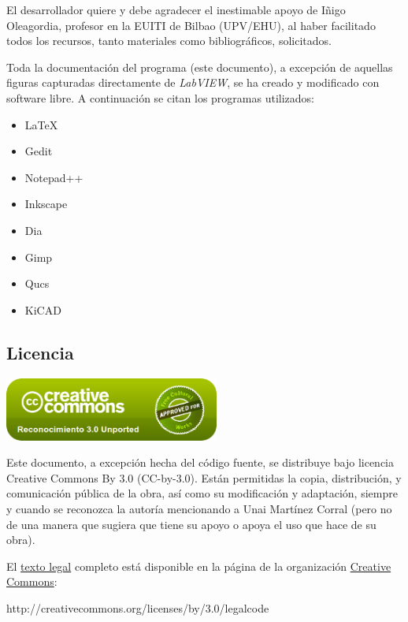 El desarrollador quiere y debe agradecer el inestimable apoyo de Iñigo Oleagordia, profesor en la EUITI de Bilbao (UPV/EHU), al haber facilitado todos los recursos, tanto materiales como bibliográficos, solicitados.

Toda la documentación del programa (este documento), a excepción de aquellas figuras capturadas directamente de \textit{LabVIEW}, se ha creado y modificado con software libre. A continuación se citan los programas utilizados:

\begin{itemize}
  \item{LaTeX}
  \item{Gedit}
  \item{Notepad++}
  \item{Inkscape}
  \item{Dia}
  \item{Gimp}
  \item{Qucs}
  \item{KiCAD}
\end{itemize}
  
\subsection{Licencia}

\begin{center}
 \includegraphics[width=200pt]{./images/ccby.png}
\end{center}

Este documento, a excepción hecha del código fuente, se distribuye bajo licencia Creative Commons By 3.0 (CC-by-3.0). Están permitidas la copia, distribución, y comunicación pública de la obra, así como su modificación y adaptación, siempre y cuando se reconozca la autoría mencionando a Unai Martínez Corral (pero no de una manera que sugiera que tiene su apoyo o apoya el uso que hace de su obra).

El \href{http://creativecommons.org/licenses/by/3.0/legalcode}{texto legal} completo está disponible en la página de la organización \href{http://creativecommons.org}{Creative Commons}:
\begin{center}http://creativecommons.org/licenses/by/3.0/legalcode\end{center}


